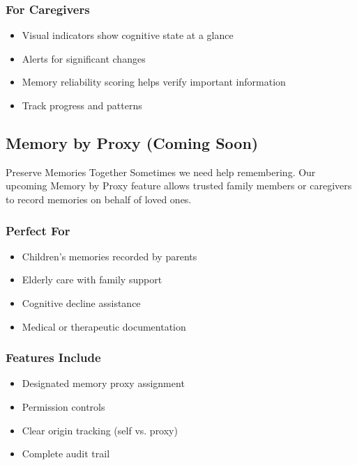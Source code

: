 \documentclass[11pt,letterpaper]{article}
\begin{document}
\subsubsection{For Caregivers}
\begin{itemize}[leftmargin=*]
    \item Visual indicators show cognitive state at a glance
    \item Alerts for significant changes
    \item Memory reliability scoring helps verify important information
    \item Track progress and patterns
\end{itemize}

\subsection{Memory by Proxy (Coming Soon)}

\begin{featurebox}{Preserve Memories Together}
Sometimes we need help remembering. Our upcoming Memory by Proxy feature allows trusted family members or caregivers to record memories on behalf of loved ones.
\end{featurebox}

\subsubsection{Perfect For}
\begin{itemize}[leftmargin=*]
    \item Children's memories recorded by parents
    \item Elderly care with family support
    \item Cognitive decline assistance
    \item Medical or therapeutic documentation
\end{itemize}

\subsubsection{Features Include}
\begin{itemize}[leftmargin=*]
    \item Designated memory proxy assignment
    \item Permission controls
    \item Clear origin tracking (self vs. proxy)
    \item Complete audit trail
\end{itemize}
\end{document}
